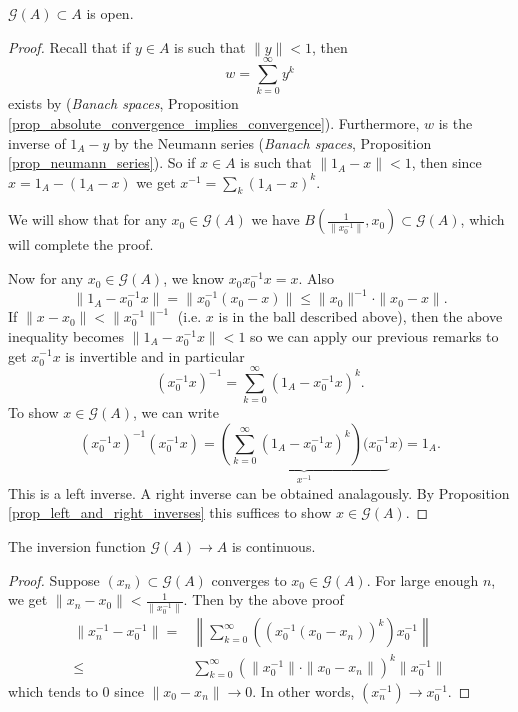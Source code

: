 \documentclass[12pt]{article}
\begin{document}
\begin{proposition}
\label{prop_invertible_elts_are_open}
	$\mathcal{G}(A) \subset A$ is open.
\end{proposition}
\begin{proof}
	Recall that if $y\in A$ is such that $\|y\| < 1$, then 
	\begin{equation*}
		w = \sum_{k=0}^\infty y^k
	\end{equation*}
	exists by (\textit{Banach spaces}, Proposition \ref{prop_absolute_convergence_implies_convergence}). Furthermore, $w$ is the inverse of $1_A - y$ by the Neumann series (\textit{Banach spaces}, Proposition \ref{prop_neumann_series}). So if $x\in A$ is such that $\|1_A - x\| < 1$, then since $x = 1_A - (1_A - x)$ we get $x^{-1} = \sum_k (1_A - x)^k$.

	We will show that for any $x_0\in\mathcal{G}(A)$ we have $B(\frac{1}{\|x_0^{-1}\|}, x_0) \subset \mathcal{G}(A)$, which will complete the proof.

	Now for any $x_0\in\mathcal{G}(A)$, we know $x_0x_0^{-1}x = x$. Also 
	\begin{equation*}
		\|1_A - x_0^{-1}x\| = \|x_0^{-1}(x_0-x)\| \leq \|x_0\|^{-1}\cdot\|x_0-x\|.
	\end{equation*}
	If $\|x-x_0\| < \|x_0^{-1}\|^{-1}$ (i.e. $x$ is in the ball described above), then the above inequality becomes $\|1_A - x_0^{-1}x\| < 1$ so we can apply our previous remarks to get $x_0^{-1}x$ is invertible and in particular
	\begin{equation*}
		(x_0^{-1}x)^{-1} = \sum_{k=0}^\infty (1_A - x_0^{-1}x)^k.
	\end{equation*}
	To show $x\in\mathcal{G}(A)$, we can write 
	\begin{equation*}
		(x_0^{-1}x)^{-1}(x_0^{-1}x) = \underbrace{\left( \sum_{k=0}^\infty (1_A - x_0^{-1}x)^k \right) (x_0^{-1} }_{x^{-1}} x) = 1_A.
	\end{equation*}
	This is a left inverse. A right inverse can be obtained analagously. By Proposition \ref{prop_left_and_right_inverses} this suffices to show $x\in \mathcal{G}(A)$. 
\end{proof}

\begin{corollary}
	The inversion function $\mathcal{G}(A) \to A$ is continuous.
\end{corollary}
\begin{proof}
	Suppose $(x_n)\subset \mathcal{G}(A)$ converges to $x_0\in\mathcal{G}(A)$. For large enough $n$, we get $\|x_n - x_0\| < \frac{1}{\|x_0^{-1}\|}$. Then by the above proof 
	\begin{align*}
		\|x_n^{-1} - x_0^{-1}\|
		=& \left\|\sum_{k=0}^\infty((x_0^{-1}(x_0-x_n))^k)x_0^{-1}\right\| \\
		\leq& \sum_{k=0}^\infty(\|x_0^{-1}\| \cdot \|x_0 - x_n\|)^k \|x_0^{-1}\|
	\end{align*}
	which tends to 0 since $\|x_0-x_n\|\to 0$. In other words, $(x_n^{-1}) \to x_0^{-1}$. 
\end{proof}
\end{document}
